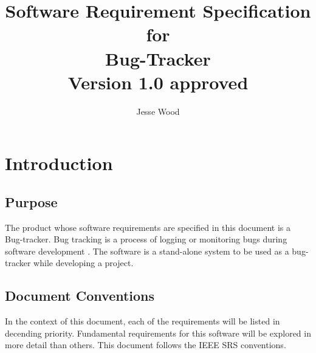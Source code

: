 \documentclass{article}
\newcommand{\comment}[1]{}
\begin{document}
\title{
	Software Requirement Specification \\ 
	for \\ 
	Bug-Tracker \\ 
	Version 1.0 approved
}
\author{Jesse Wood}

\maketitle

\newpage

\tableofcontents \label{contents}

\section{Introduction}
\subsection{Purpose}
\comment{
Identify the product whose software requirements are specified in this document, including the revision or release number. Describe the scope of the product that is covered by the SRS. Particularly if this STS describes only part of the system or a single subsytem.
	}
The product whose software requirements are specified in this document is a Bug-tracker. Bug tracking is a process of logging or monitoring bugs during software development \parencite{ibm20}. The software is a stand-alone system to be used as a bug-tracker while developing a project.
\subsection{Document Conventions}
\comment{
	Decribe any standards of typographical conventions that were followed when writing this \acrlong{srs}, such as fonts or highlighting that have special significance. For exmaple, state whether priorites for higher-level requirements are assumed to be inheritied by detailed requirements, or whether every requirement statement is to have its own priorities.
	}
In the context of this document, each of the requirements will be listed in decending priority. Fundamental requirements for this software will be explored in more detail than others. This document follows the IEEE SRS conventions.
\end{document}
